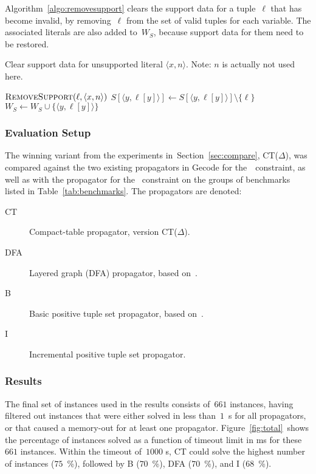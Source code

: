 \documentclass[a4paper,11pt]{article}
\newcommand{\Secref}[1]{Section~\ref{#1}}
\newcommand{\Algoref}[1]{Algorithm~\ref{#1}}
\newcommand{\Table}{\Constraint{Table}}
\newcommand{\Regular}{\Constraint{Regular}}
\newcommand{\FOREACH}[1]{\FORALL{{#1} \textbf{do}}}
\newcommand{\ENDFOREACH}{\ENDFOR}
\def\PROCEDURE{\item[\textbf{PROCEDURE}]}
\def\RemoveSupport{\textsc{RemoveSupport}}
\numberwithin{equation}{section}
\begin{document}
\begin{description}
\Algoref{algo:removesupport} clears the support data for a tuple~$\ell$ that has
become invalid, by removing~$\ell$ from the set of valid tuples for each variable.
The associated literals are also added to~$W_S$, because support data for them
need to be restored.
 
\begin{algorithm}
\caption{Clear support data for unsupported literal $\langle x,n
  \rangle$.  Note: $n$ is actually not used here.}
  \label{algo:removesupport}
\begin{algorithmic}[1]
  \PROCEDURE $\RemoveSupport(\ell, \langle x,n \rangle)$
  \FOREACH{$y \in X$}
    \STATE $S[\langle y,\ell[y] \rangle] \gets S[\langle y,\ell[y] \rangle] \setminus \{ \ell \}$
      \STATE $W_S \gets W_S \cup \{ \langle y,\ell[y] \rangle \}$
    \ENDIF
  \ENDFOREACH
\end{algorithmic}
\end{algorithm}

   \end{description}
\clearpage
\subsubsection{Evaluation Setup}
The winning variant from the experiments in~\Secref{sec:compare},
CT($\Delta$), was compared against the two existing propagators
in Gecode for the~\Table~constraint, as well as with the propagator
for the \Regular~constraint on the groups of benchmarks
listed in Table~\ref{tab:benchmarks}. The propagators are
denoted:

\begin{description}
  \item[CT] Compact-table propagator, version CT($\Delta$).
  \item[DFA] Layered graph (DFA) propagator, based on~\cite{Pesant:seqs}.
  \item[B] Basic positive tuple set propagator, based on~\cite{DBLP:journals/ai/BessiereRYZ05}.
  \item[I] Incremental positive tuple set propagator.
\end{description}

\subsubsection{Results}

The final set of instances used in the results consists of~$661$ instances,
having filtered out instances that were either solved in less than~$1$~s for all
propagators, or that caused a memory-out for at least one propagator.
Figure~\ref{fig:total}~shows the percentage of instances solved as a function
of timeout limit in ms for these~$661$ instances. Within the timeout of~$1000$ s,
CT could solve the highest number of instances ($75$~\%), followed by B ($70$~\%),
DFA ($70$~\%), and I ($68$~\%).
\end{document}
